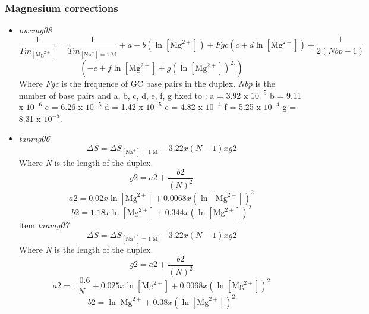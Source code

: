 \documentclass{article}
\begin{document}
\subsubsection{Magnesium corrections}
  \begin{itemize}
  \item \textit{owcmg08}
 \begin{displaymath}
 \frac{1}{Tm_{[\mbox{Mg}^{2+}]}} = \frac{1}{Tm_{[\mbox{Na}^+]=1\;\mathrm{M}}} + a
 - b (\ln [\mbox{Mg}^{2+}]) + Fgc (c + d \ln [\mbox{Mg}^{2+}]) + \frac{1}{2 (Nbp-1)} 
 \end{displaymath}
 \begin{displaymath}
 (-e + f \ln [\mbox{Mg}^{2+}] + g (\ln [\mbox{Mg}^{2+}])^{2}])
 \end{displaymath}
 Where \emph{Fgc} is the frequence of GC base pairs in the duplex.
 \emph{Nbp} is the number of base pairs
 and a, b, c, d, e, f, g fixed to :
 a = 3.92 x $10^{-5}$
 b = 9.11 x $10^{-6}$
 c = 6.26 x $10^{-5}$
 d = 1.42 x $10^{-5}$
 e = 4.82 x $10^{-4}$
 f = 5.25 x $10^{-4}$
 g = 8.31 x $10^{-5}$.
 \item \textit{tanmg06}
 \begin{displaymath}
  \Delta{}S=\Delta{}S_{[\mbox{Na}^+]=1\;\mathrm{M}}- 3.22 x (N - 1) x g2  
 \end{displaymath}
 Where \emph{N} is the length of the duplex.
 \begin{displaymath}
  g2=a2 + \frac{b2}{(N)^2}  
 \end{displaymath}
 \begin{displaymath}
  a2= 0.02 x \ln [\mbox{Mg}^{2+}] + 0.0068 x (\ln [\mbox{Mg}^{2+}])^2  
 \end{displaymath}
 \begin{displaymath}
  b2= 1.18 x \ln [\mbox{Mg}^{2+}] + 0.344 x (\ln [\mbox{Mg}^{2+}])^2
 \end{displaymath}
 item \textit{tanmg07}
 \begin{displaymath}
  \Delta{}S=\Delta{}S_{[\mbox{Na}^+]=1\;\mathrm{M}}- 3.22 x (N - 1) x g2  
 \end{displaymath}
 Where \emph{N} is the length of the duplex.
 \begin{displaymath}
  g2=a2 + \frac{b2}{(N)^2}  
 \end{displaymath}
 \begin{displaymath}
  a2= \frac{-0.6}{N} + 0.025 x \ln [\mbox{Mg}^{2+}] + 0.0068 x (\ln [\mbox{Mg}^{2+}])^2  
 \end{displaymath}
 \begin{displaymath}
  b2= \ln [\mbox{Mg}^{2+} + 0.38 x (\ln [\mbox{Mg}^{2+}])^2  
 \end{displaymath}
 \end{itemize} 
\end{document}
